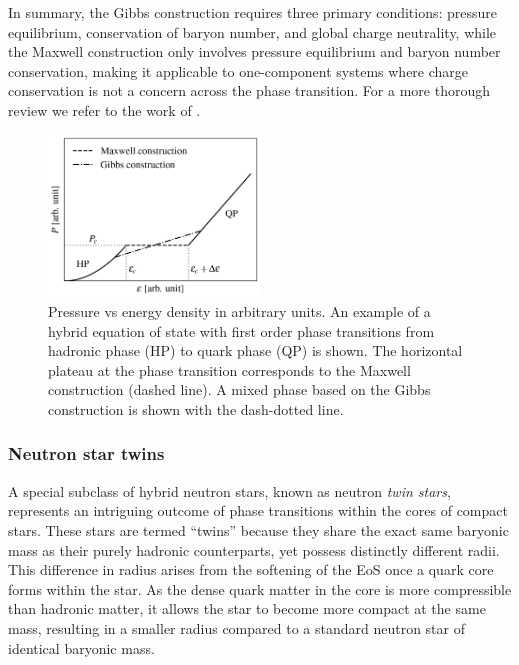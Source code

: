 \documentclass[main.tex]{subfiles}
\begin{document}
    In summary, the Gibbs construction requires three primary conditions: pressure equilibrium, conservation of baryon number, and global charge neutrality, while the Maxwell construction only involves pressure equilibrium and baryon number conservation, making it applicable to one-component systems where charge conservation is not a concern across the phase transition. For a more thorough review we refer to the work of \cite{Glendenning:1998ck, 2000NuPhA.677..463S, 2010JPhG...37b5201B, 2018EPJP..133..445V, 2019arXiv190602522B, 2022arXiv220700033S}.

    \begin{figure}
        \centering
        \includegraphics[width=0.5\textwidth]{figures/chapter1/p_vs_epsilon.png}
        \caption{Pressure vs energy density in arbitrary units. An example of a hybrid equation of state with first order phase transitions from hadronic phase (HP) to quark phase (QP) is shown. The horizontal plateau at the phase transition corresponds to the Maxwell construction (dashed line). A mixed phase based on the Gibbs construction is shown with the dash-dotted line.}
        \label{fig:p_vs_epsilon}
    \end{figure}

    \subsubsection{Neutron star twins}
    A special subclass of hybrid neutron stars, known as neutron \textit{twin stars}, represents an intriguing outcome of phase transitions within the cores of compact stars. These stars are termed ``twins'' because they share the exact same baryonic mass as their purely hadronic counterparts, yet possess distinctly different radii. This difference in radius arises from the softening of the EoS once a quark core forms within the star. As the dense quark matter in the core is more compressible than hadronic matter, it allows the star to become more compact at the same mass, resulting in a smaller radius compared to a standard neutron star of identical baryonic mass.
    
\end{document}
